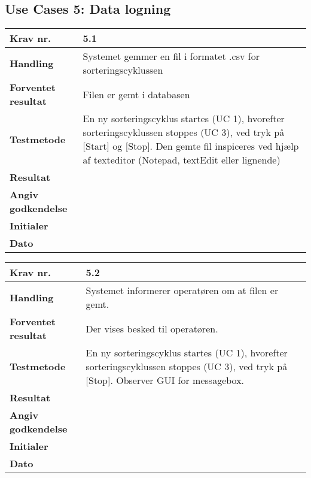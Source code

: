 \newpage
  \subsection{Use Cases 5: Data logning}

	\begin{center}
		\begin{longtable}{ | m{4cm}| m{8.5cm}|} 
			\hline
			\textbf{Krav nr.} & 5.1 \\ 
			\hline
			\textbf{Handling} & Systemet gemmer en fil i formatet .csv for sorteringscyklussen  \\
			\hline
			\textbf{Forventet resultat} & Filen er gemt i databasen  \\
			\hline
			\textbf{Testmetode}  & En ny sorteringscyklus startes (UC 1), hvorefter sorteringscyklussen stoppes (UC 3), ved tryk på [Start] og [Stop]. 
Den gemte fil inspiceres ved hjælp af texteditor (Notepad, textEdit eller lignende)  \\
			\hline
			\textbf{Resultat}  &    \\
			\hline
			\textbf{Angiv godkendelse} &     \\
			\hline
			\textbf{Initialer} &     \\
			\hline
			\textbf{Dato} &    \\
			\hline
		\end{longtable}
	\end{center}			

	\begin{center}
		\begin{longtable}{ | m{4cm}| m{8.5cm}|} 
			\hline
			\textbf{Krav nr.} & 5.2 \\ 
			\hline
			\textbf{Handling} & Systemet informerer operatøren om at filen er gemt.  \\
			\hline
			\textbf{Forventet resultat} & Der vises besked til operatøren.  \\
			\hline
			\textbf{Testmetode}  & En ny sorteringscyklus startes (UC 1), hvorefter sorteringscyklussen stoppes (UC 3), ved tryk på [Stop]. Observer GUI for messagebox.  \\
			\hline
			\textbf{Resultat}  &    \\
			\hline
			\textbf{Angiv godkendelse} &     \\
			\hline
			\textbf{Initialer} &     \\
			\hline
			\textbf{Dato} &    \\
			\hline
		\end{longtable}
	\end{center}